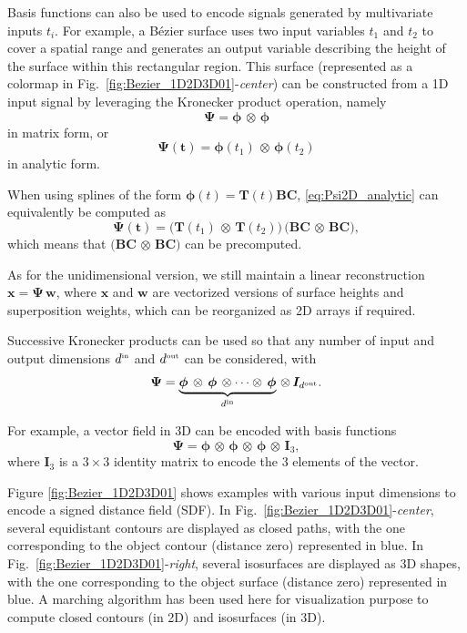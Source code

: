\documentclass[10pt,a4paper]{article} %
\newcommand{\tp}[1]{\text{\tiny#1}}
\begin{document}
Basis functions can also be used to encode signals generated by multivariate inputs $t_i$. For example, a Bézier surface uses two input variables $t_1$ and $t_2$ to cover a spatial range and generates an output variable describing the height of the surface within this rectangular region. This surface (represented as a colormap in Fig.~\ref{fig:Bezier_1D2D3D01}-\emph{center}) can be constructed from a 1D input signal by leveraging the Kronecker product operation, namely
\begin{equation}
	\bm{\Psi} = \bm{\phi} \,\otimes\, \bm{\phi}
\end{equation}
in matrix form, or
\begin{equation}
	\bm{\Psi}(\bm{t}) = \bm{\phi}(t_1) \,\otimes\, \bm{\phi}(t_2)
	\label{eq:Psi2D_analytic}
\end{equation}
in analytic form.

When using splines of the form $\bm{\phi}(t)=\bm{T}(t)\bm{B}\bm{C}$, \eqref{eq:Psi2D_analytic} can equivalently be computed as
\begin{equation}
	\bm{\Psi}(\bm{t}) = \big(\bm{T}(t_1) \,\otimes\, \bm{T}(t_2)\big) \, \big(\bm{B}\bm{C} \,\otimes\, \bm{B}\bm{C}\big),
\end{equation}
which means that $\big(\bm{B}\bm{C} \,\otimes\, \bm{B}\bm{C}\big)$ can be precomputed.

As for the unidimensional version, we still maintain a linear reconstruction $\bm{x} = \bm{\Psi} \, \bm{w}$, where $\bm{x}$ and $\bm{w}$ are vectorized versions of surface heights and superposition weights, which can be reorganized as 2D arrays if required.

Successive Kronecker products can be used so that any number of input and output dimensions ${d^\tp{in}}$ and ${d^\tp{out}}$ can be considered, with 
\begin{equation}
	\bm{\Psi} = \underbrace{\bm{\phi} \,\otimes\, \bm{\phi} \,\otimes \cdots \otimes\,  \bm{\phi}}_{d^\tp{in}} \,\otimes\,  \bm{I}_{d^\tp{out}}.
\end{equation}

For example, a vector field in 3D can be encoded with basis functions
\begin{equation}
	\bm{\Psi} = \bm{\phi} \,\otimes\, \bm{\phi} \,\otimes\, \bm{\phi} \,\otimes\, \bm{I}_3,
\end{equation}
where $\bm{I}_3$ is a $3\!\times\!3$ identity matrix to encode the 3 elements of the vector. 

Figure \ref{fig:Bezier_1D2D3D01} shows examples with various input dimensions to encode a signed distance field (SDF). In Fig.~\ref{fig:Bezier_1D2D3D01}-\emph{center}, several equidistant contours are displayed as closed paths, with the one corresponding to the object contour (distance zero) represented in blue. In Fig.~\ref{fig:Bezier_1D2D3D01}-\emph{right}, several isosurfaces are displayed as 3D shapes, with the one corresponding to the object surface (distance zero) represented in blue. A marching algorithm has been used here for visualization purpose to compute closed contours (in 2D) and isosurfaces (in 3D). %
\end{document}
